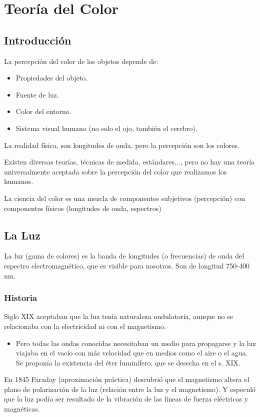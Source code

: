 \chapter{Teoría del Color}
\section{Introducción}
La percepción del color de los objetos depende de:
\begin{itemize}
	\item Propiedades del objeto.
	\item Fuente de luz.
	\item Color del entorno.
	\item Sistema visual humano (no solo el ojo, también el cerebro).
\end{itemize}

La realidad física, son longitudes de onda, pero la percepción son los colores.

Existen diversas teorías, técnicas de medida, estándares..., pero no hay una teoría universalmente aceptada sobre la percepción del color que realizamos los humanos.

La ciencia del color es una mezcla de componentes subjetivos (percepción) con componentes físicos (longitudes de onda, espectros)

\section{La Luz}
La luz (gama de colores) es la banda de longitudes (o frecuencias) de onda del espectro electromagnético, que es visible para nosotros. Son de longitud 750-400 nm.

\subsection{Historia}
Siglo XIX aceptaban que la luz tenía naturaleza ondulatoria, aunque no se relacionaba con la electricidad ni con el magnetismo.
\begin{itemize}
	\item Pero todas las ondas conocidas necesitaban un medio para propagarse y la luz viajaba en el vacío con más velocidad que en medios como el aire o el agua. Se proponía la existencia del éter luminífero, que se desecha en el s. XIX.
\end{itemize}

En 1845 Faraday (aproximación práctica) descubrió que el magnetismo altera el plano de polarización de la luz (relación entre la luz y el magnetismo). Y especuló que la luz podía ser resultado de la vibración de las líneas de fuerza eléctricas y magnéticas.
\pagebreak

